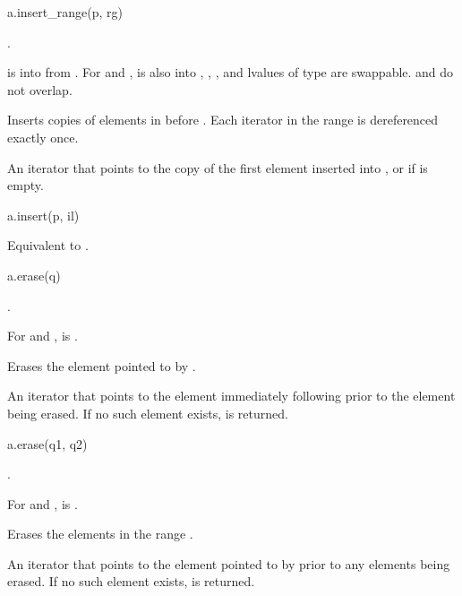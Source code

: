 %
\begin{itemdecl}
a.insert_range(p, rg)
\end{itemdecl}

\begin{itemdescr}
\pnum
\result
{}.

\pnum
\expects
{} is  into 
from .
For  and ,
 is also
 into ,
,
, and
lvalues of type  are swappable.
 and  do not overlap.

\pnum
\effects
Inserts copies of elements in  before .
Each iterator in the range  is dereferenced exactly once.

\pnum
\returns
An iterator
that points to the copy of the first element inserted into , or
 if  is empty.
\end{itemdescr}

\begin{itemdecl}
a.insert(p, il)
\end{itemdecl}

\begin{itemdescr}
\pnum
\effects
Equivalent to .
\end{itemdescr}

%
\begin{itemdecl}
a.erase(q)
\end{itemdecl}

\begin{itemdescr}
\pnum
\result
{}.

\pnum
\expects
For  and ,
 is .

\pnum
\effects
Erases the element pointed to by .

\pnum
\returns
An iterator that points to the element immediately following 
prior to the element being erased.
If no such element exists,  is returned.
\end{itemdescr}

\begin{itemdecl}
a.erase(q1, q2)
\end{itemdecl}

\begin{itemdescr}
\pnum
\result
{}.

\pnum
\expects
For  and ,  is .

\pnum
\effects
Erases the elements in the range \tcode{[q1, q2)}.

\pnum
\returns
An iterator that points to the element pointed to by 
prior to any elements being erased.
If no such element exists,  is returned.
\end{itemdescr}

